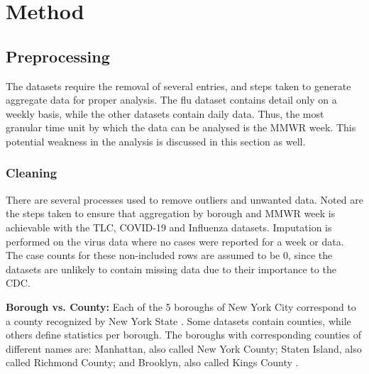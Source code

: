 \documentclass[11pt]{article}
\begin{document}

\section{Method}

\subsection{Preprocessing}

The datasets require the removal of several entries, 
and steps taken to generate aggregate data for proper analysis.
The flu dataset contains detail only on a weekly basis, 
while the other datasets contain daily data. 
Thus, the most granular time unit by which the data can be analysed is the MMWR week.
This potential weakness in the analysis is discussed in this section as well.

\subsubsection{Cleaning}

There are several processes used to remove outliers and unwanted data.
Noted are the steps taken to ensure that aggregation by borough and MMWR week is achievable with the TLC, COVID-19 and Influenza datasets.
Imputation is performed on the virus data where no cases were reported for a week or data.
The case counts for these non-included rows are assumed to be $0$, 
since the datasets are unlikely to contain missing data due to their importance to the CDC.

\textbf{Borough vs. County:} Each of the 5 boroughs of New York City correspond to a county recognized by New York State \cite{countytoborough}.
Some datasets contain counties, while others define statistics per borough. The boroughs with corresponding counties of different names are: 
Manhattan, also called New York County; 
Staten Island, also called Richmond County;
and Brooklyn, also called Kings County \cite{countytoborough}.
\end{document}
